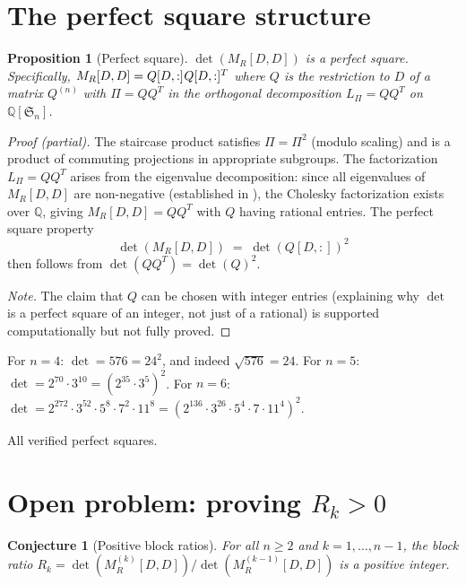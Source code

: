 \documentclass[11pt]{article}
\newtheorem{proposition}[theorem]{Proposition}
\newtheorem{conjecture}[theorem]{Conjecture}
\theoremstyle{definition}
\theoremstyle{remark}
\newcommand{\QQ}{\mathbb{Q}}
\newcommand{\Sym}{\mathfrak{S}}
\begin{document}
\section{The perfect square structure}

\begin{proposition}[Perfect square]\label{prop:square}
$\det(M_R[D,D])$ is a perfect square.  Specifically,
$M_R[D,D] = Q[D,:]^{\vphantom{T}} Q[D,:]^T$ where $Q$ is the
restriction to $D$ of a matrix $Q^{(n)}$ with $\Pi = Q Q^T$
in the orthogonal decomposition $L_\Pi = QQ^T$ on $\QQ[\Sym_n]$.
\end{proposition}

\begin{proof}[Proof (partial)]
The staircase product satisfies $\Pi = \Pi^2$ (modulo scaling) and
is a product of commuting projections in appropriate subgroups.
The factorization $L_\Pi = QQ^T$ arises from the eigenvalue
decomposition: since all eigenvalues of $M_R[D,D]$ are non-negative
(established in \cite{Clio-EP}), the Cholesky factorization exists
over $\QQ$, giving $M_R[D,D] = QQ^T$ with $Q$ having rational entries.
The perfect square property
\[
  \det(M_R[D,D]) \;=\; \det(Q[D,:])^2
\]
then follows from $\det(QQ^T) = \det(Q)^2$.

\noindent
\emph{Note.}  The claim that $Q$ can be chosen with integer entries
(explaining why $\det$ is a perfect square of an integer, not just
of a rational) is supported computationally but not fully proved.
\end{proof}

For $n = 4$: $\det = 576 = 24^2$, and indeed $\sqrt{576} = 24$.
For $n = 5$: $\det = 2^{70} \cdot 3^{10} = (2^{35} \cdot 3^5)^2$.
For $n = 6$: $\det = 2^{272} \cdot 3^{52} \cdot 5^8 \cdot 7^2 \cdot 11^8
= (2^{136} \cdot 3^{26} \cdot 5^4 \cdot 7 \cdot 11^4)^2$.

All verified perfect squares.


\section{Open problem: proving $R_k > 0$}

\begin{conjecture}[Positive block ratios]\label{conj:rk-pos}
For all $n \ge 2$ and $k = 1, \ldots, n-1$, the block ratio
$R_k = \det(M_R^{(k)}[D,D]) / \det(M_R^{(k-1)}[D,D])$ is a
positive integer.
\end{conjecture}
\end{document}
